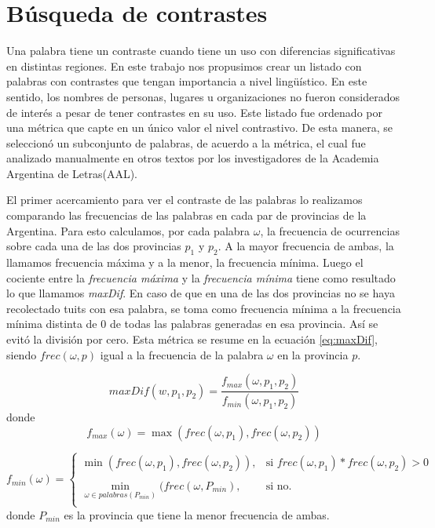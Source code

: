 \section{Búsqueda de contrastes}

Una palabra tiene un contraste cuando tiene un uso con diferencias significativas en
distintas regiones. En este trabajo nos propusimos crear un listado con palabras con contrastes que tengan
importancia a nivel lingüístico. En este sentido, los nombres de personas, lugares u organizaciones no 
fueron considerados de interés a pesar de tener contrastes en su uso.
Este listado fue ordenado por una métrica que capte en un único valor el nivel contrastivo. De esta manera, 
se seleccionó un subconjunto de palabras, de acuerdo a la métrica, el cual fue analizado manualmente en otros textos por los investigadores de la Academia Argentina de Letras(AAL).

El primer acercamiento para ver el contraste de las palabras lo realizamos comparando las frecuencias de las palabras 
en cada par de provincias de la Argentina. Para esto calculamos, por cada palabra $\omega$, la frecuencia de ocurrencias sobre cada una de las dos provincias $p_1$ y $p_2$. A la mayor frecuencia de ambas, la llamamos frecuencia máxima y a la menor, la frecuencia mínima. Luego el cociente entre la \textit{frecuencia máxima} y la \textit{frecuencia mínima} tiene como resultado lo que llamamos \textit{maxDif}. En caso de que en una de las dos provincias no se haya 
recolectado tuits con esa palabra, se toma como frecuencia mínima a la frecuencia mínima distinta de 0 de todas las palabras generadas en esa provincia. Así se evitó la división por cero. Esta métrica se resume en la ecuación \ref{eq:maxDif}, siendo $frec(\omega,p)$ igual a la frecuencia de la palabra $\omega$ en la provincia $p$.


\begin{equation}
  \label{eq:maxDif} 
  maxDif(w,p_1,p_2) = \frac{f_{max}(\omega,p_1,p_2)}{f_{min}(\omega,p_1,p_2)}
\end{equation}
donde 
\begin{equation}
f_{max}(\omega) = \max (frec(\omega,p_1),frec(\omega,p_2))
\end{equation}

\begin{equation}
 f_{min}(\omega) = \left\{ \begin{array}{lll}
             \min(frec(\omega,p_1),frec(\omega,p_2)), & \text{si } frec(\omega,p_1) * frec(\omega,p_2) > 0  & \\
             \\
             \min\limits_{\omega \in palabras(P_{min})} (frec(\omega,P_{min}) , &  \text{si no.} &  \\
             \end{array}
   \right.
\end{equation}
   donde $P_{min}$ es la provincia que tiene la menor frecuencia de ambas.



